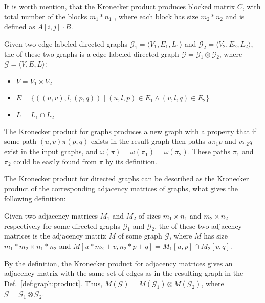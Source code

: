 It is worth mention, that the Kronecker product produces blocked matrix $C$, 
with total number of the blocks $m_1 * n_1$ , where each block has size 
$m_2 * n_2$ and is defined as $A[i,j] \cdot B$.

\begin{definition}
\label{def:graph:product}
Given two edge-labeled directed graphs $\mathcal{G}_1=\langle V_1, E_1, L_1 \rangle$ 
and $\mathcal{G}_2=\langle V_2, E_2, L_2 \rangle$,
the  of these two graphs is a edge-labeled directed graph
$\mathcal{G}=\mathcal{G}_1 \otimes \mathcal{G}_2$, 
where $\mathcal{G}= \langle V, E, L \rangle$:
\begin{itemize}
    \item $V = V_1 \times V_2$
    \item $E = \{((u,v),l,(p,q)) \mid (u,l,p) \in E_1 \wedge (v,l,q) \in E_2 \}$
    \item $L = L_1 \cap L_2$
\end{itemize}
\end{definition}

The Kronecker product for graphs produces a new graph with a property
that if some path $(u,v)\pi(p,q)$ exists in the result graph
then paths $u\pi_1p$ and $v\pi_2q$ exist in the input graphs, 
and $\omega(\pi) = \omega(\pi_1) = \omega(\pi_2)$. 
These paths $\pi_1$ and $\pi_2$ could be easily found from $\pi$ by its definition.

The Kronecker product for directed graphs can be described as 
the Kronecker product of the corresponding adjacency matrices of graphs, 
what gives the following definition:

\begin{definition}
Given two adjacency matrices $M_1$ and $M_2$ of sizes 
$m_1 \times n_1$ and $m_2 \times n_2$ respectively
for some directed graphs $\mathcal{G}_1$ and $\mathcal{G}_2$,
the  of these two adjacency matrices is the adjacency matrix $M$
of some graph $\mathcal{G}$, where $M$ has size $m_1 * m_2 \times n_1 * n_2$ and $M[u * m_2 + v,n_2 * p + q] = M_1[u,p] \cap M_2[v,q]$.
\end{definition}

By the definition, the Kronecker product for adjacency matrices gives an 
adjacency matrix with the same set of edges as in the resulting graph in the
Def.~\ref{def:graph:product}. Thus, $M(\mathcal{G}) = M(\mathcal{G}_1) \otimes
M(\mathcal{G}_2)$, where $\mathcal{G} = \mathcal{G}_1 \otimes \mathcal{G}_2$.

